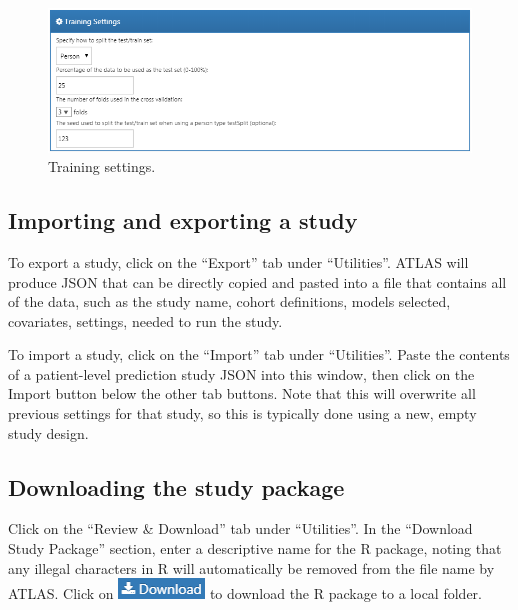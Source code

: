 \documentclass[11pt]{book}
\theoremstyle{definition}
\theoremstyle{definition}
\theoremstyle{definition}
\theoremstyle{remark}
\begin{document}
\begin{figure}

{\centering \includegraphics[width=1\linewidth]{images/PatientLevelPrediction/trainingSettings} 

}

\caption{Training settings.}\label{fig:trainingSettings}
\end{figure}

\hypertarget{importing-and-exporting-a-study}{%
\subsection{Importing and exporting a study}\label{importing-and-exporting-a-study}}

To export a study, click on the ``Export'' tab under ``Utilities''. ATLAS will produce JSON that can be directly copied and pasted into a file that contains all of the data, such as the study name, cohort definitions, models selected, covariates, settings, needed to run the study.

To import a study, click on the ``Import'' tab under ``Utilities''. Paste the contents of a patient-level prediction study JSON into this window, then click on the Import button below the other tab buttons. Note that this will overwrite all previous settings for that study, so this is typically done using a new, empty study design.

\hypertarget{downloading-the-study-package}{%
\subsection{Downloading the study package}\label{downloading-the-study-package}}

Click on the ``Review \& Download'' tab under ``Utilities''. In the ``Download Study Package'' section, enter a descriptive name for the R package, noting that any illegal characters in R will automatically be removed from the file name by ATLAS. Click on \includegraphics{images/PatientLevelPrediction/download.png} to download the R package to a local folder.
\end{document}
